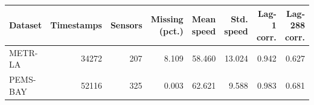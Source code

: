 \begin{tabular}{lrrrrrrr}
\toprule
Dataset & Timestamps & Sensors & Missing (pct.) & Mean speed & Std. speed & Lag-1 corr. & Lag-288 corr. \\
\midrule
METR-LA & 34272 & 207 & 8.109 & 58.460 & 13.024 & 0.942 & 0.627 \\
PEMS-BAY & 52116 & 325 & 0.003 & 62.621 & 9.588 & 0.983 & 0.681 \\
\bottomrule
\end{tabular}
